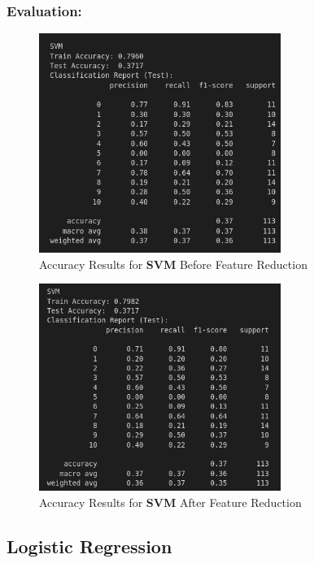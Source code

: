 \documentclass[a4paper,12pt]{article}
\begin{document}
\subsubsection{Evaluation:}
\begin{figure}[H]
    \centering
    \includegraphics[width=0.7\textwidth]{./images/svmacc1.png}
    \caption{Accuracy Results for \textbf{SVM} Before Feature Reduction}
    \label{fig:fig_5}
\end{figure}
\begin{figure}[H]
    \centering
    \includegraphics[width=0.7\textwidth]{./images/svmacc2.png}
    \caption{Accuracy Results for \textbf{SVM} After Feature Reduction}
    \label{fig:fig_6}
\end{figure}

\subsection{Logistic Regression}
\end{document}
